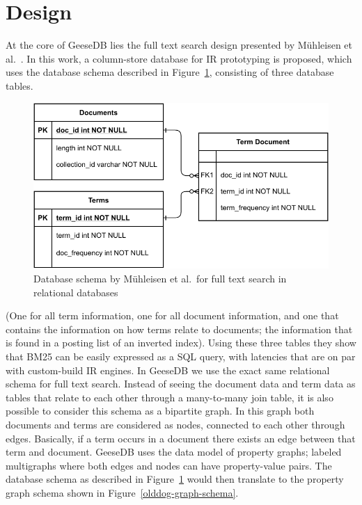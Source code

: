 \section{Design}
At the core of GeeseDB lies the full text search design presented by M\"{u}hleisen et al.~\cite{OldDog}. In this work, a column-store database for IR prototyping is proposed, which uses the database schema described in Figure~\ref{olddog_schema}, consisting of three database tables.
\begin{figure}
	\centering
	\includegraphics[width=\linewidth]{./imgs/olddog-schema-2.pdf}
	\caption{Database schema by M\"{u}hleisen et al.~for full text search in relational databases}
	\label{olddog_schema}
\end{figure}
(One for all term information, one for all document information, and one that contains the information on how terms relate to documents; the information that is found in a posting list of an inverted index). Using these three tables they show that BM25 can be easily expressed as a SQL query, with latencies that are on par with custom-build IR engines. In GeeseDB we use the exact same relational schema for full text search.
Instead of seeing the document data and term data as tables that relate to each other through a many-to-many join table, it is also possible to consider this schema as a bipartite graph. In this graph both documents and terms are considered as nodes, connected to each other through edges. Basically, if a term occurs in a document there exists an edge between that term and document. GeeseDB uses the data model of property graphs; labeled multigraphs where both edges and nodes can have property-value pairs. The database schema as described in Figure~\ref{olddog_schema} would then translate to the property graph schema shown in Figure~\ref{olddog-graph-schema}.

